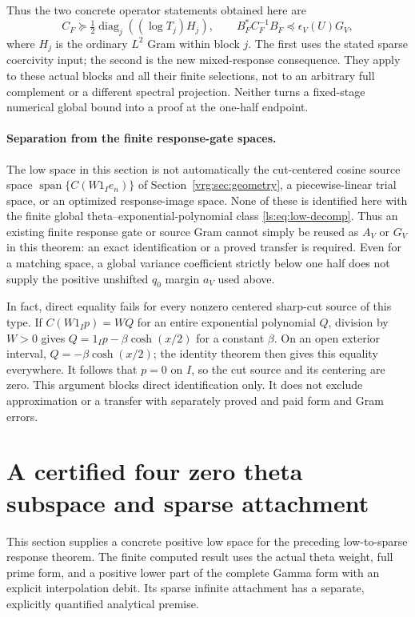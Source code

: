 \documentclass[11pt,a4paper]{article}
\numberwithin{equation}{section}
\theoremstyle{definition}\newtheorem{definition}[theorem]{Definition}
\theoremstyle{remark}\newtheorem{remark}[theorem]{Remark}
\newcommand{\Hh}{\mathcal H}\newcommand{\Hw}{\mathcal H}
\begin{document}
Thus the two concrete operator statements obtained here are
\[
 C_F\succeq\tfrac12\operatorname{diag}_j((\log T_j)H_j),
 \qquad B_F^*C_F^{-1}B_F\preceq\epsilon_V(U)G_V,
\]
where $H_j$ is the ordinary $L^2$ Gram within block $j$.
The first uses the stated sparse coercivity input; the second is the new
mixed-response consequence. They apply to these actual blocks and all
their finite selections, not to an arbitrary full complement or a different
spectral projection. Neither turns a fixed-stage numerical global bound
into a proof at the one-half endpoint.


\paragraph{Separation from the finite response-gate spaces.}
The low space in this section is not automatically the cut-centered
cosine source space $\operatorname{span}\{C(W1_Ie_n)\}$ of
Section~\ref{vrg:sec:geometry}, a piecewise-linear trial space, or an
optimized response-image space. None of these is identified here with
the finite global theta--exponential-polynomial class
\eqref{ls:eq:low-decomp}. Thus an existing finite response gate or source
Gram cannot simply be reused as $A_V$ or $G_V$ in this theorem: an exact
identification or a proved transfer is required. Even for a matching
space, a global variance coefficient strictly below one half does not
supply the positive unshifted $q_0$ margin $a_V$ used above.

In fact, direct equality fails for every nonzero centered sharp-cut
source of this type. If $C(W1_Ip)=WQ$ for an entire exponential polynomial
$Q$, division by $W>0$ gives
$Q=1_Ip-\beta\cosh(x/2)$ for a constant $\beta$.
On an open exterior interval, $Q=-\beta\cosh(x/2)$; the identity theorem
then gives this equality everywhere. It follows that $p=0$ on $I$,
so the cut source and its centering are zero. This argument blocks direct
identification only. It does not exclude approximation or a transfer
with separately proved and paid form and Gram errors.


\section{A certified four zero theta subspace and sparse attachment}
\label{sec:four-zero-certificate}

This section supplies a concrete positive low space for the preceding
low-to-sparse response theorem. The finite computed result uses the actual
theta weight, full prime form, and a positive lower part of the complete
Gamma form with an explicit interpolation debit. Its sparse infinite
attachment has a separate, explicitly quantified analytical premise.
\end{document}
